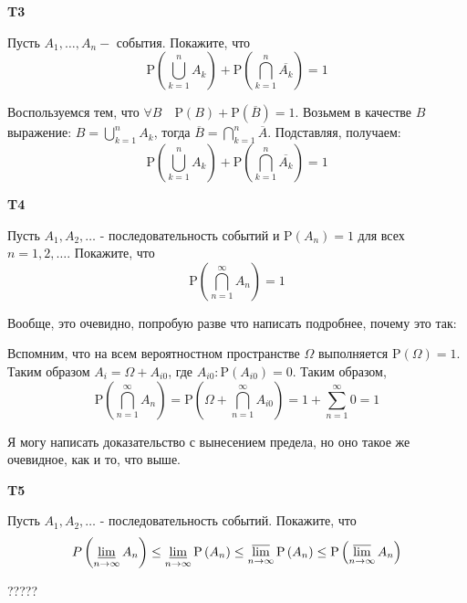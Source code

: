 \documentclass[a4paper,12pt]{article} %
\begin{document}
\begin{example}\textbf{T3}

Пусть $A_{1}, \ldots, A_{n}-$ события. Покажите, что
$$
\mathrm{P}\left(\bigcup_{k=1}^{n} A_{k}\right)+\mathrm{P}\left(\bigcap_{k=1}^{n} \overline{A_{k}}\right)=1
$$

Воспользуемся тем, что $\forall B \quad \mathrm{P}(B)+\mathrm{P}(\overline{B})=1$. 
Возьмем в качестве $B$ выражение: $B=\bigcup_{k=1}^n A_k$, тогда 
$\overline{B}=\bigcap_{k=1}^n\overline{A}$.
Подставляя, получаем:
$$
\mathrm{P}\left(\bigcup_{k=1}^{n} A_{k}\right)+\mathrm{P}\left(\bigcap_{k=1}^{n} \overline{A_{k}}\right)=1
$$


\end{example}




\begin{example}\textbf{T4}

Пусть $A_{1}, A_{2}, \ldots$ - последовательность событий и $\mathrm{P}\left(A_{n}\right)=1$ для всех $n=1,2, \ldots .$ Покажите, что
$$
\mathrm{P}\left(\bigcap_{n=1}^{\infty} A_{n}\right)=1
$$

Вообще, это очевидно, попробую разве что написать подробнее, почему это так:

Вспомним, что на всем вероятностном пространстве $\Omega$ выполняется $ \mathrm{P}(\Omega)=1.$ 
Таким образом $A_i=\Omega+A_{i0}$, где $ A_{i0}: \mathrm{P}(A_{i0})=0$.
Таким образом, 
$$
\mathrm{P}\left(\bigcap_{n=1}^{\infty} A_{n}\right)=
\mathrm{P}\left(\Omega+\bigcap_{n=1}^{\infty} A_{i0}\right)=
1+\sum_{n=1}^{\infty} 0=1
$$

Я могу написать доказательство с вынесением предела, но оно такое же очевидное, как и то, что выше.


\end{example}


\begin{example}\textbf{T5}

Пусть $A_{1}, A_{2}, \ldots$ - последовательность событий. Покажите, что
$$
P\left(\varliminf_{n \rightarrow \infty} A_{n}\right) \leq 
\varliminf_{n \rightarrow \infty} \mathrm{P}\left(A_{n}\right) \leq 
\varlimsup_{n \rightarrow \infty} \mathrm{P}\left(A_{n}\right) \leq 
\mathrm{P}\left(\varlimsup_{n \rightarrow \infty} A_{n}\right)
$$

?????

\end{example}
\end{document}
